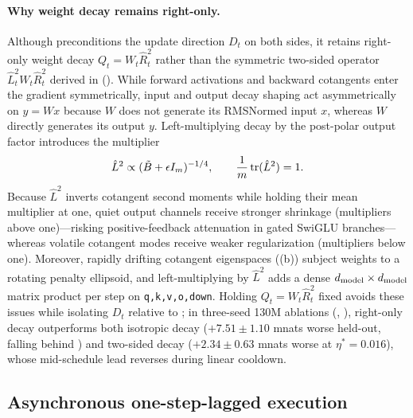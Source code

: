 \paragraph{Why weight decay remains right-only.}
Although  preconditions the update direction $D_t$ on both sides, it retains right-only weight decay $Q_t=W_t\hat R_t^2$ rather than the symmetric two-sided operator $\hat L_t^2 W_t\hat R_t^2$ derived in  (). While forward activations and backward cotangents enter the gradient symmetrically, input and output decay shaping act asymmetrically on $y=Wx$ because $W$ does not generate its RMSNormed input $x$, whereas $W$ directly generates its output $y$. Left-multiplying decay by the post-polar output factor introduces the multiplier
\[
 \hat L^2\propto(\tilde B+\epsilon I_m)^{-1/4},
 \qquad
 \frac{1}{m}\operatorname{tr}(\hat L^2)=1.
\]
Because $\hat L^2$ inverts cotangent second moments while holding their mean multiplier at one, quiet output channels receive stronger shrinkage (multipliers above one)---risking positive-feedback attenuation in gated SwiGLU branches---whereas volatile cotangent modes receive weaker regularization (multipliers below one). Moreover, rapidly drifting cotangent eigenspaces ((b)) subject weights to a rotating penalty ellipsoid, and left-multiplying by $\hat L^2$ adds a dense $d_{\mathrm{model}}\times d_{\mathrm{model}}$ matrix product per step on \texttt{q,k,v,o,down}. Holding $Q_t=W_t\hat R_t^2$ fixed avoids these issues while isolating $D_t$ relative to ; in three-seed 130M ablations (, ), right-only decay outperforms both isotropic decay ($+7.51\pm 1.10$ mnats worse held-out, falling behind ) and two-sided decay ($+2.34\pm 0.63$ mnats worse at $\eta^*=0.016$), whose mid-schedule lead reverses during linear cooldown.

\subsection{Asynchronous one-step-lagged execution}
\label{sec:systems}

